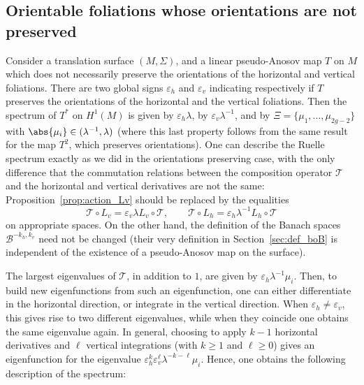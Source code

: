 \documentclass[10pt]{amsart}
\newcommand{\boB}{\mathcal{B}}
\newcommand{\boT}{\mathcal{T}}
\let\epsilon\varepsilon
\theoremstyle{definition}
\numberwithin{equation}{section}
\begin{document}
\subsection{Orientable foliations whose orientations are not preserved}
\label{subsec:orientable_foliations}

Consider a translation surface $(M,\Sigma)$, and a linear pseudo-Anosov map
$T$ on $M$ which does not necessarily preserve the orientations of the
horizontal and vertical foliations. There are two global signs $\epsilon_h$
and $\epsilon_v$ indicating respectively if $T$ preserves the orientations of
the horizontal and the vertical foliations. Then the spectrum of $T^*$ on
$H^1(M)$ is given by $\epsilon_h \lambda$, by $\epsilon_v \lambda^{-1}$, and
by $\Xi = \{\mu_1,\dotsc, \mu_{2g-2}\}$ with $\abs{\mu_i} \in (\lambda^{-1},
\lambda)$ (where this last property follows from the same result for the map
$T^2$, which preserves orientations). One can describe the Ruelle spectrum
exactly as we did in the orientations preserving case, with the only
difference that the commutation relations between the composition operator
$\boT$ and the horizontal and vertical derivatives are not the same:
Proposition~\ref{prop:action_Lv} should be replaced by the equalities
\begin{equation*}
\boT \circ L_v = \epsilon_v \lambda L_v \circ \boT,
\qquad
\boT \circ L_h = \epsilon_h \lambda^{-1} L_h \circ \boT
\end{equation*}
on appropriate spaces. On the other hand, the definition of the Banach spaces
$\boB^{-k_h, k_v}$ need not be changed (their very definition in
Section~\ref{sec:def_boB} is independent of the existence of a pseudo-Anosov
map on the surface).

The largest eigenvalues of $\boT$, in addition to $1$, are given by
$\epsilon_h \lambda^{-1} \mu_i$. Then, to build new eigenfunctions from such
an eigenfunction, one can either differentiate in the horizontal direction,
or integrate in the vertical direction. When $\epsilon_h \neq \epsilon_v$,
this gives rise to two different eigenvalues, while when they coincide one
obtains the same eigenvalue again. In general, choosing to apply $k-1$
horizontal derivatives and $\ell$ vertical integrations (with $k \geq 1$ and
$\ell \geq 0$) gives an eigenfunction for the eigenvalue $\epsilon_h^k
\epsilon_v^\ell \lambda^{-k-\ell}\mu_i$. Hence, one obtains the following
description of the spectrum:
\end{document}
